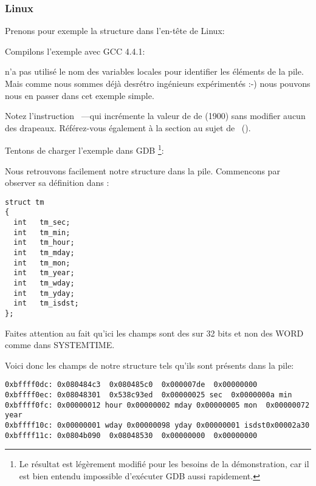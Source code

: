 ﻿\subsubsection{Linux}

Prenons pour exemple la structure  dans l'en-tête  de Linux:



Compilons l'exemple avec GCC 4.4.1:



\IDA n'a pas utilisé le nom des variables locales pour identifier les éléments de la pile.
Mais comme nous sommes déjà desrétro ingénieurs expérimentés :-) nous pouvons nous en passer dans 
cet exemple simple.


Notez l'instruction ~---qui incrémente la valeur de \EAX de  (1900) 
sans modifier aucun des drapeaux. Référez-vous également à la section au sujet de \LEA{}~().


Tentons de charger l'exemple dans GDB \footnote{Le résultat  est légèrement modifié pour 
les besoins de la démonstration, car il est bien entendu impossible d'exécuter GDB aussi rapidement.}:



Nous retrouvons facilement notre structure dans la pile. Commencons par observer sa définition dans 
:

\begin{lstlisting}[caption=time.h, label=struct_tm,style=customc]
struct tm
{
  int	tm_sec;
  int	tm_min;
  int	tm_hour;
  int	tm_mday;
  int	tm_mon;
  int	tm_year;
  int	tm_wday;
  int	tm_yday;
  int	tm_isdst;
};
\end{lstlisting}

Faites attention au fait qu'ici les champs sont des \Tint sur 32 bits et non des WORD comme dans 
SYSTEMTIME.

Voici donc les champs de notre structure tels qu'ils sont présents dans la pile:

\begin{lstlisting}
0xbffff0dc:	0x080484c3	0x080485c0	0x000007de	0x00000000
0xbffff0ec:	0x08048301	0x538c93ed	0x00000025 sec	0x0000000a min
0xbffff0fc:	0x00000012 hour	0x00000002 mday	0x00000005 mon 	0x00000072 year
0xbffff10c:	0x00000001 wday	0x00000098 yday	0x00000001 isdst0x00002a30
0xbffff11c:	0x0804b090	0x08048530	0x00000000	0x00000000
\end{lstlisting}

